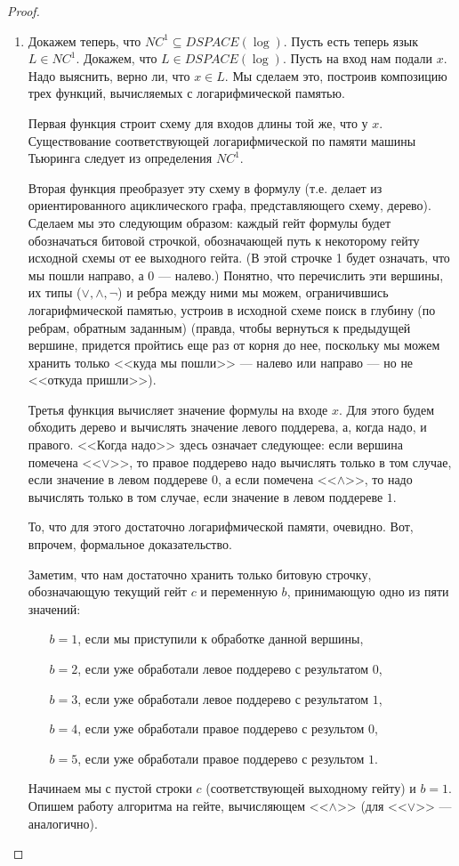 \begin{proof}
\begin{enumerate}
	\item Докажем теперь, что $NC^1 \subseteq DSPACE(\log)$. 
	Пусть есть теперь язык $L \in NC^1$. Докажем, что $L\in DSPACE(\log)$. 
	Пусть на вход нам подали $x$. Надо выяснить, верно ли, что
	$x\in L$. Мы сделаем это, построив композицию трех функций, вычисляемых
	с логарифмической памятью.

	Первая функция строит схему для входов длины той же, что у $x$.
	Существование соответствующей логарифмической по памяти машины Тьюринга
	следует из определения $NC^1$.

	Вторая функция преобразует эту схему в формулу
	(т.е. делает из ориентированного ациклического графа, 
	представляющего схему, дерево). Сделаем
	мы это следующим образом: каждый гейт формулы будет 
	обозначаться битовой строчкой, обозначающей путь к некоторому гейту
	исходной схемы от ее выходного гейта.
	(В этой строчке 1 будет означать, что мы пошли направо, а 0 --- налево.)
	Понятно, что перечислить эти вершины, их типы ($\lor, \land, \lnot$) 
	и ребра между ними мы можем, ограничившись логарифмической памятью,
	устроив в исходной схеме поиск в глубину (по ребрам, обратным заданным)
	(правда, чтобы вернуться к предыдущей вершине, придется пройтись еще
	раз от корня до нее, поскольку мы можем хранить только <<куда мы пошли>> ---
	налево или направо --- но не <<откуда пришли>>).

	Третья функция вычисляет значение формулы на входе $x$. 
	Для этого будем обходить дерево и вычислять значение левого поддерева,
	а, когда надо, и правого. <<Когда надо>> здесь означает
	следующее: если вершина помечена <<$\lor$>>, 
	то правое поддерево надо вычислять только в том случае, если значение в левом 
	поддереве $0$, а если помечена <<$\land$>>, то надо вычислять 
	только в том случае, если значение в левом поддереве $1$. 

	То, что для этого достаточно логарифмической памяти, очевидно.
	Вот, впрочем, формальное доказательство.

	{\small
	Заметим, что нам достаточно хранить только битовую строчку,
	обозначающую текущий гейт $c$ и переменную $b$, принимающую одно из пяти значений:
	\begin{enumerate}
	\item[$b=1$,] \leftskip 3mm
              если мы приступили к обработке данной вершины, 
	\item[$b=2$,] если уже обработали левое поддерево с результатом $0$,
	\item[$b=3$,] если уже обработали левое поддерево с результатом $1$,
	\item[$b=4$,] если уже обработали правое поддерево с результом $0$,
	\item[$b=5$,] если уже обработали правое поддерево с результом $1$.
	\end{enumerate}
	Начинаем мы с пустой строки $c$ (соответствующей выходному гейту)
	и $b=1$. Опишем работу алгоритма на гейте, вычисляющем <<$\land$>> 
	(для <<$\lor$>> --- аналогично). 

}
\end{enumerate}
\end{proof}
